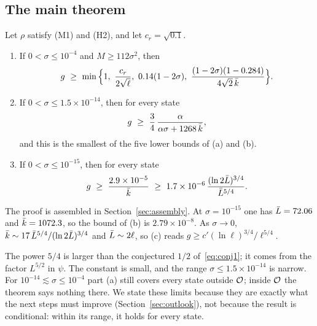 \subsection{The main theorem}

\begin{theorem}\label{thm:main}
Let $\rho$ satisfy \textup{(M1)} and \textup{(H2)}, and let $c_r=\sqrt{0.1}$.
\begin{enumerate}
\item[(a)] If $0<\sigma\le10^{-4}$ and $M\ge112\sigma^2$, then
\[
g\ \ge\ \min\Big\{1,\ \frac{c_r}{2\sqrt\ell},\ 0.14(1-2\sigma),\ \frac{(1-2\sigma)(1-0.284)}{4\sqrt2\,\kb}\Big\}.
\]
\item[(b)] If $0<\sigma\le1.5\times10^{-14}$, then for every state
\[
g\ \ge\ \frac34\,\frac{\alpha}{\alpha\sigma+1268\,\kb},
\]
and this is the smallest of the five lower bounds of (a) and (b).
\item[(c)] If $0<\sigma\le10^{-15}$, then for every state
\[
g\ \ge\ \frac{2.9\times10^{-5}}{\kb}\ \ge\ 1.7\times10^{-6}\,\frac{(\ln2\Lb)^{3/4}}{\Lb^{5/4}} .
\]
\end{enumerate}
\proofst
\end{theorem}

The proof is assembled in Section~\ref{sec:assembly}.
At $\sigma=10^{-15}$ one has $\bar L=72.06$ and $\bar k=1072.3$, so the bound of (b) is $2.79\times10^{-8}$.
As $\sigma\to0$, $\bar k\sim17\,\bar L^{5/4}/(\ln2\bar L)^{3/4}$ and $\bar L\sim2\ell$, so (c) reads $g\ge c'(\ln\ell)^{3/4}/\ell^{5/4}$.

\begin{remark}\label{rem:limits}
The power $5/4$ is larger than the conjectured $1/2$ of~\eqref{eq:conj1}; it comes from the factor $L^{5/2}$ in $\psi$.
The constant is small, and the range $\sigma\le1.5\times10^{-14}$ is narrow.
For $10^{-14}\lesssim\sigma\le10^{-4}$ part (a) still covers every state outside $\mathcal O$; inside $\mathcal O$ the theorem says nothing there.
We state these limits because they are exactly what the next steps must improve (Section~\ref{sec:outlook}), not because the result is conditional: within its range, it holds for every state.
\end{remark}


